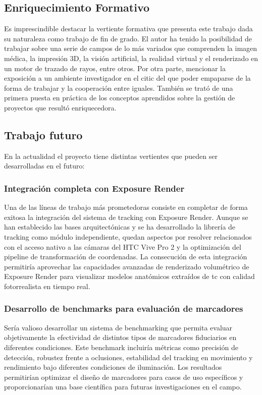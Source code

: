 \subsection{Enriquecimiento Formativo}
Es imprescindible destacar la vertiente formativa que presenta este trabajo dada su naturaleza como trabajo de fin de grado. El autor ha tenido la posibilidad de trabajar sobre una serie de campos de lo más variados que comprenden la imagen médica, la impresión 3D, la visión artificial, la realidad virtual y el renderizado en un motor de trazado de rayos, entre otros. Por otra parte, mencionar la exposición a un ambiente investigador en el \acrshort{citic} del que poder empaparse de la forma de trabajar y la cooperación entre iguales. También se trató de una primera puesta en práctica de los conceptos aprendidos sobre la gestión de proyectos que resultó enriquecedora.
\subsection{Trabajo futuro}
En la actualidad el proyecto tiene distintas vertientes que pueden ser desarrolladas en el futuro:

\subsubsection{Integración completa con Exposure Render}
Una de las líneas de trabajo más prometedoras consiste en completar de forma exitosa la integración del sistema de tracking con Exposure Render. Aunque se han establecido las bases arquitectónicas y se ha desarrollado la librería de tracking como módulo independiente, quedan aspectos por resolver relacionados con el acceso nativo a las cámaras del HTC Vive Pro 2 y la optimización del pipeline de transformación de coordenadas. La consecución de esta integración permitiría aprovechar las capacidades avanzadas de renderizado volumétrico de Exposure Render para visualizar modelos anatómicos extraídos de \acrshort{tc} con calidad fotorrealista en tiempo real.

\subsubsection{Desarrollo de benchmarks para evaluación de marcadores}
Sería valioso desarrollar un sistema de benchmarking que permita evaluar objetivamente la efectividad de distintos tipos de marcadores fiduciarios en diferentes condiciones. Este benchmark incluiría métricas como precisión de detección, robustez frente a oclusiones, estabilidad del tracking en movimiento y rendimiento bajo diferentes condiciones de iluminación. Los resultados permitirían optimizar el diseño de marcadores para casos de uso específicos y proporcionarían una base científica para futuras investigaciones en el campo.

